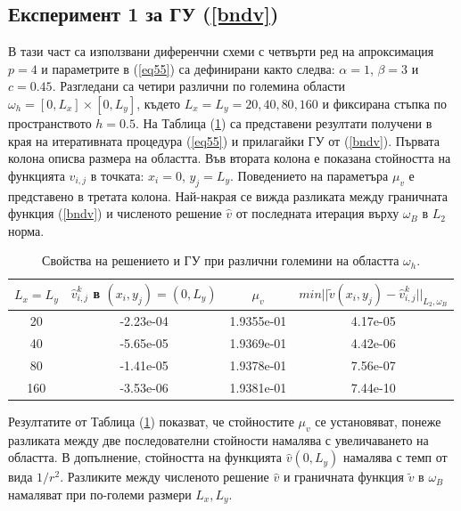 \documentclass{article}
\newcommand{\rf}[1]{(\ref{#1})}
\begin{document}
\subsection{Експеримент 1 за ГУ \rf{bndv}}
В тази част са използвани диференчни схеми с четвърти ред на апроксимация $p=4$ и параметрите в \rf{eq55} са дефинирани както следва: $\alpha = 1$, $\beta = 3$ и $c=0.45$. Разгледани са четири различни по големина области $\omega_h = [0, L_x] \times [0, L_y]$, където $L_x = L_y = 20, 40, 80, 160$ и фиксирана стъпка по пространството $h=0.5$. На Таблица \rf{tab:valBnd1} са представени резултати получени в края на итеративната процедура \rf{eq55} и прилагайки ГУ от \rf{bndv}. Първата колона описва размера на областта. Във втората колона е показана стойността на функцията $\widehat{v}_{i,j}$ в точката: ${x}_i = 0$, $ {y}_j =   L_{ y}$. Поведението на параметъра $\mu_v$ е представено в третата колона. Най-накрая се вижда разликата между граничната функция \rf{bndv} и численото решение $\widehat{v}$ от последната итерация върху $\omega_B$ в $L_2$ норма.
\begin{table}[ht]
\centering
		\begin{tabular}{||c||c|c|c||}
			\hline
			\hline
      $ L_{ x} = L_{ y}$        &         $\widehat{v}_{i,j}^k$ в  $({x}_i, {y}_j) = (0, L_{ y})$    &    $\mu_v$  &   \mbox{$min|| \tilde v( x_i, y_j) - \widehat v ^k_{i,j} ||_{L_2,\omega_B}$}\\
   			\hline
			\hline
      20    & -2.23e-04    &  1.9355e-01  &     4.17e-05  \\
               	 \hline
    40      & -5.65e-05   &   1.9369e-01    &    4.42e-06 \\
			\hline 	
      80    & -1.41e-05  &      1.9378e-01      &       7.56e-07  \\
			\hline 	
     160     & -3.53e-06  &    1.9381e-01        &     7.44e-10 \\
		   \hline
	             \hline
                     \end{tabular}
\caption{Свойства на решението и ГУ при различни големини на областта $\omega_h$.}
\label{tab:valBnd1}
\end{table}
\FloatBarrier
Резултатите от Таблица \rf{tab:valBnd1} показват, че стойностите $\mu_v$ се установяват, понеже разликата между две последователни стойности намалява с увеличаването на областта. В допълнение, стойността на функцията $\widehat v(0,L_y)$ намалява с темп от вида $1/r^2$. Разликите между численото решение $\widehat v$ и граничната функция $\tilde v$ в $\omega_B$ намаляват при по-големи размери $L_x, L_y$. 
\end{document}
